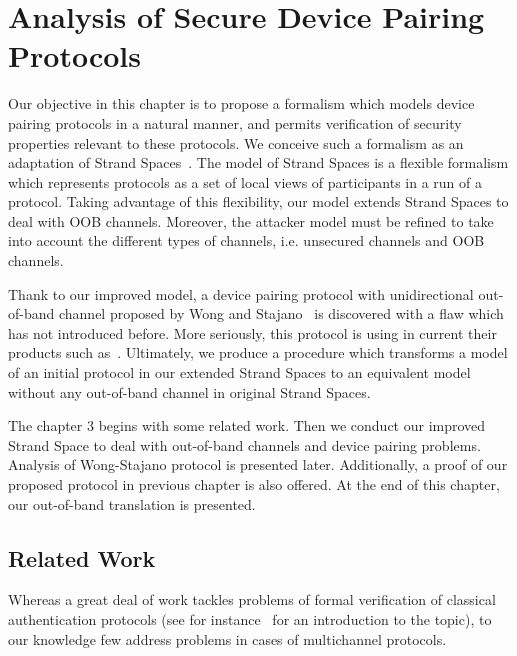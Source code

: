 
\chapter{Analysis of Secure Device Pairing Protocols} %

\label{Analysis of Secure Device Pairing Protocols} %


Our objective in this chapter is to propose a formalism which models device pairing protocols 
in a natural manner, and permits verification of security properties relevant to these protocols.
We conceive such a formalism as an adaptation of Strand Spaces~\cite{674832}. The model of Strand Spaces is a flexible formalism which represents protocols as a set of local views of participants in a run of a protocol. Taking advantage of this flexibility, our model extends Strand Spaces to deal with OOB channels. Moreover, the attacker model must be refined to take into account the different types of channels, i.e. unsecured channels and OOB channels.

Thank to our improved model, a device pairing protocol with unidirectional out-of-band channel proposed by Wong and Stajano~\cite{10.1109/MPRV.2007.76} is discovered with a flaw which has not introduced before. More seriously, this protocol is using in current their products such as~\cite{Stajano:2011aa,Stajano:2014aa}. Ultimately, we produce a procedure which transforms a model of an initial protocol in our extended Strand Spaces to an  equivalent model without any out-of-band channel in original Strand Spaces.

The chapter 3 begins with some related work. Then we conduct our improved Strand Space to deal with out-of-band channels and device pairing problems. Analysis of Wong-Stajano protocol is presented later. Additionally, a proof of our proposed protocol in previous chapter is also offered. At the end of this chapter, our out-of-band translation is presented. 

\section{Related Work}
Whereas a great deal of work tackles problems of formal verification of classical authentication protocols (see for instance~\cite{Ryan:2000:MAS:1407727} for an introduction to the topic), to our knowledge few address problems in cases of multichannel protocols.

